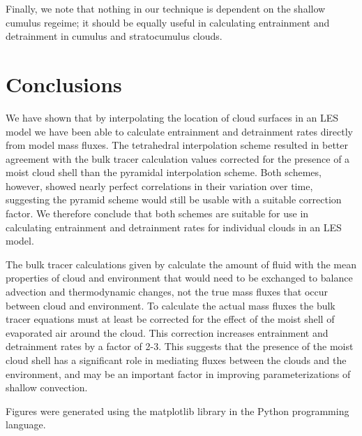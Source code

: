 \documentclass[12pt]{article}
\begin{document}
Finally, we note that nothing in our technique is dependent on the shallow 
cumulus regeime; it should be equally useful in calculating entrainment and 
detrainment in cumulus and stratocumulus clouds.


\section{Conclusions}

We have shown that by interpolating the location of cloud surfaces in an LES
model we have been able to calculate entrainment and detrainment rates directly 
from model mass fluxes.  The tetrahedral interpolation scheme resulted in
better agreement with the bulk tracer calculation values corrected for the 
presence of a moist cloud shell than the pyramidal interpolation scheme.  Both 
schemes, however, showed nearly perfect correlations in their variation over 
time, suggesting the pyramid scheme would still be usable with a suitable 
correction factor.  We therefore conclude that both schemes are suitable for 
use in calculating entrainment and detrainment rates for individual clouds in 
an LES model.

The bulk tracer calculations given by \cite{Siebesma1995} calculate the amount
of fluid with the mean properties of cloud and environment that would need to
be exchanged to balance advection and thermodynamic changes, not the true mass
fluxes that occur between cloud and environment.  To calculate the actual mass
fluxes the bulk tracer equations must at least be corrected for the effect of
the moist shell of evaporated air around the cloud.  This correction increases
entrainment and detrainment rates by a factor of 2-3.  This suggests that the
presence of the moist cloud shell has a significant role in mediating fluxes
between the clouds and the environment, and may be an important factor in 
improving parameterizations of shallow convection.



\begin{acknowledgment}
Figures were generated using the matplotlib library in the Python
programming language.
\end{acknowledgment}

\end{document}
